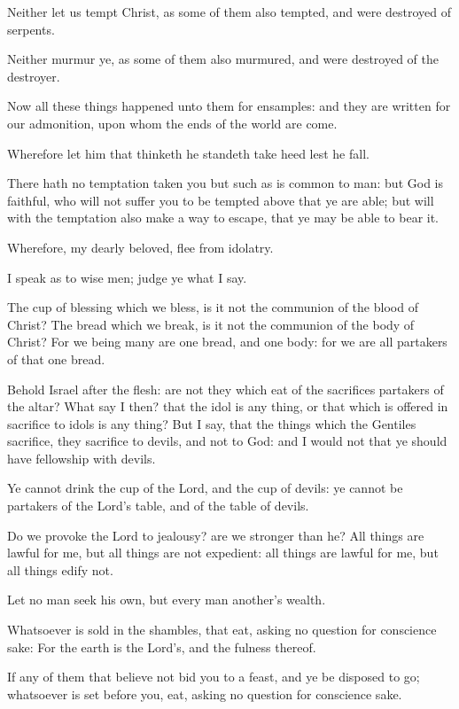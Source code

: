 \Verse Neither let us tempt Christ, as some of them also tempted, and were destroyed of serpents.

\Verse Neither murmur ye, as some of them also murmured, and were destroyed of the destroyer.

\Verse Now all these things happened unto them for ensamples: and they are written for our admonition, upon whom the ends of the world are come.

\Verse Wherefore let him that thinketh he standeth take heed lest he fall.

\Verse There hath no temptation taken you but such as is common to man: but God is faithful, who will not suffer you to be tempted above that ye are able; but will with the temptation also make a way to escape, that ye may be able to bear it.

\Verse Wherefore, my dearly beloved, flee from idolatry.

\Verse I speak as to wise men; judge ye what I say.

\Verse The cup of blessing which we bless, is it not the communion of the blood of Christ? The bread which we break, is it not the communion of the body of Christ?  \Verse For we being many are one bread, and one body: for we are all partakers of that one bread.

\Verse Behold Israel after the flesh: are not they which eat of the sacrifices partakers of the altar?  \Verse What say I then? that the idol is any thing, or that which is offered in sacrifice to idols is any thing?  \Verse But I say, that the things which the Gentiles sacrifice, they sacrifice to devils, and not to God: and I would not that ye should have fellowship with devils.

\Verse Ye cannot drink the cup of the Lord, and the cup of devils: ye cannot be partakers of the Lord's table, and of the table of devils.

\Verse Do we provoke the Lord to jealousy? are we stronger than he?  \Verse All things are lawful for me, but all things are not expedient: all things are lawful for me, but all things edify not.

\Verse Let no man seek his own, but every man another's wealth.

\Verse Whatsoever is sold in the shambles, that eat, asking no question for conscience sake: \Verse For the earth is the Lord's, and the fulness thereof.

\Verse If any of them that believe not bid you to a feast, and ye be disposed to go; whatsoever is set before you, eat, asking no question for conscience sake.

